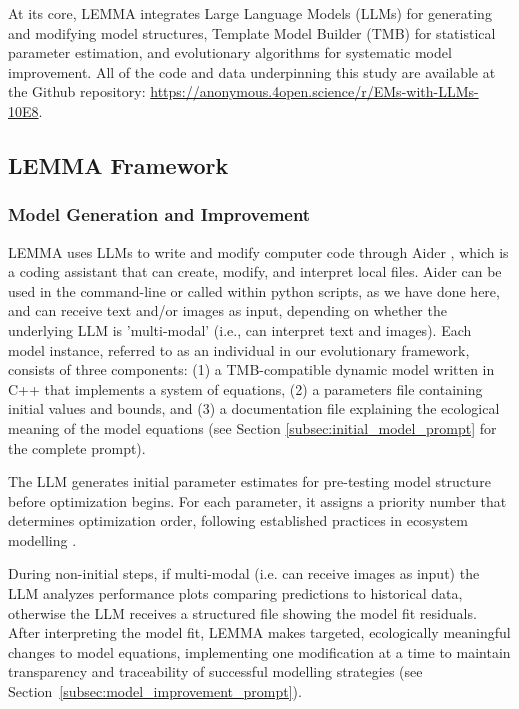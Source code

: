 At its core, LEMMA integrates Large Language Models (LLMs) for generating and modifying model structures, Template Model Builder (TMB) for statistical parameter estimation, and evolutionary algorithms for systematic model improvement. All of the code and data underpinning this study are available at the Github repository: \url{https://anonymous.4open.science/r/EMs-with-LLMs-10E8}.

\subsection{LEMMA Framework}

\subsubsection{Model Generation and Improvement}
LEMMA uses LLMs to write and modify computer code through Aider \citep{gauthier2024aider}, which is a coding assistant that can create, modify, and interpret local files. Aider can be used in the command-line or called within python scripts, as we have done here, and can receive text and/or images as input, depending on whether the underlying LLM is 'multi-modal' (i.e., can interpret text and images). Each model instance, referred to as an individual in our evolutionary framework, consists of three components: (1) a TMB-compatible dynamic model written in C++ that implements a system of equations, (2) a parameters file containing initial values and bounds, and (3) a documentation file explaining the ecological meaning of the model equations (see Section \ref{subsec:initial_model_prompt} for the complete prompt).

The LLM generates initial parameter estimates for pre-testing model structure before optimization begins. For each parameter, it assigns a priority number that determines optimization order, following established practices in ecosystem modelling \citep{Plaganyi_Punt_Hillary_Morello_Thebaud_Hutton_Pillans_Thorson_Fulton_Smith_et_al_2014}.

During non-initial steps, if multi-modal (i.e. can receive images as input) the LLM analyzes performance plots comparing predictions to historical data, otherwise the LLM receives a structured file showing the model fit residuals. After interpreting the model fit, LEMMA makes targeted, ecologically meaningful changes to model equations, implementing one modification at a time to maintain transparency and traceability of successful modelling strategies (see Section~\ref{subsec:model_improvement_prompt}).


